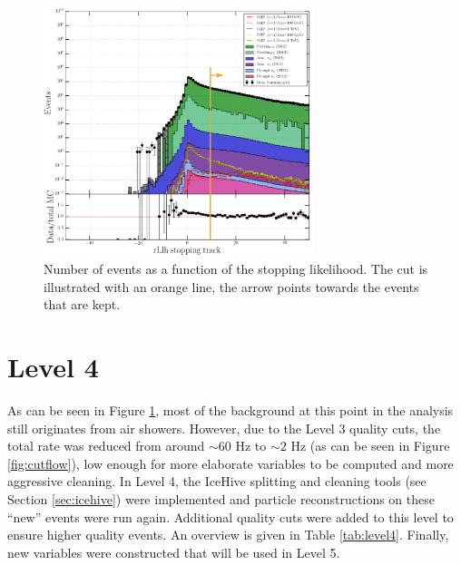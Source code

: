 \begin{figure}[t]
\centering
\includegraphics[width=0.7\textwidth]{chapter8/img/L3_zenithcut_gr_1p4835298642_rloglcut_less_15_npecut_less_50_startingtrackcut_hs_gr_0_1D_stack_finitereco_rllh_stopping_new.png}
\caption{Number of events as a function of the stopping likelihood. The cut is illustrated with an orange line, the arrow points towards the events that are kept.}
\label{fig:level3stopping}
\end{figure}

\section{Level 4}
As can be seen in Figure \ref{fig:level3stopping}, most of the background at this point in the analysis still originates from air showers. However, due to the Level 3 quality cuts, the total rate was reduced from around $\sim 60$ Hz to $\sim2$ Hz (as can be seen in Figure \ref{fig:cutflow}), low enough for more elaborate variables to be computed and more aggressive cleaning. In Level 4, the IceHive splitting and cleaning tools (see Section \ref{sec:icehive}) were implemented and particle reconstructions on these ``new'' events were run again. Additional quality cuts were added to this level to ensure higher quality events. An overview is given in Table \ref{tab:level4}. Finally, new variables were constructed that will be used in Level 5.

